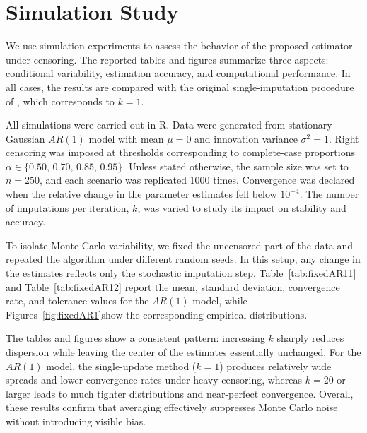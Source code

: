 \documentclass[10pt,twoside]{article}
\numberwithin{equation}{section}
\begin{document}
	\section{Simulation Study}

	\label{sec:simulations}

	

	We use simulation experiments to assess the behavior of the proposed estimator under censoring. The reported tables and figures summarize three aspects: conditional variability, estimation accuracy, and computational performance. In all cases, the results are compared with the original single-imputation procedure of \citet{park2007}, which corresponds to $k=1$.

	

All simulations were carried out in \textsf{R}. Data were generated from stationary Gaussian $AR(1)$ model with mean $\mu=0$ and innovation variance $\sigma^2=1$. Right censoring was imposed at thresholds corresponding to complete-case proportions $\alpha \in \{0.50,\,0.70,\,0.85,\,0.95\}$. Unless stated otherwise, the sample size was set to $n=250$, and each scenario was replicated 1000 times. Convergence was declared when the relative change in the parameter estimates fell below $10^{-4}$. The number of imputations per iteration, $k$, was varied to study its impact on stability and accuracy.

	

To isolate Monte Carlo variability, we fixed the uncensored part of the data and repeated the algorithm under different random seeds. In this setup, any change in the estimates reflects only the stochastic imputation step. Table~\ref{tab:fixedAR11} and Table~\ref{tab:fixedAR12} report the mean, standard deviation, convergence rate, and tolerance values for the $AR(1)$ model, while Figures~\ref{fig:fixedAR1}show the corresponding empirical distributions.

	

The tables and figures show a consistent pattern: increasing $k$ sharply reduces dispersion while leaving the center of the estimates essentially unchanged. For the $AR(1)$ model, the single-update method ($k=1$) produces relatively wide spreads and lower convergence rates under heavy censoring, whereas $k=20$ or larger leads to much tighter distributions and near-perfect convergence. Overall, these results confirm that averaging effectively suppresses Monte Carlo noise without introducing visible bias.

	
\end{document}
